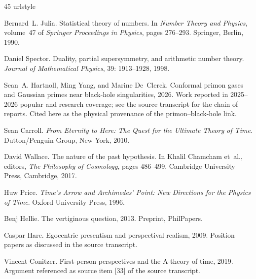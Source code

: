 \documentclass[11pt,a4paper]{article}
\theoremstyle{plain}
\theoremstyle{definition}
\theoremstyle{remark}
\begin{document}
\begin{thebibliography}{45}
\providecommand{\natexlab}[1]{#1}
\providecommand{\url}[1]{\texttt{#1}}
\expandafter\ifx\csname urlstyle\endcsname\relax
  \providecommand{\doi}[1]{doi: #1}\else
  \providecommand{\doi}{doi: \begingroup \urlstyle{rm}\Url}\fi

Bernard~L. Julia.
\newblock Statistical theory of numbers.
\newblock In \emph{Number Theory and Physics}, volume~47 of \emph{Springer
  Proceedings in Physics}, pages 276--293. Springer, Berlin, 1990.

Daniel Spector.
\newblock Duality, partial supersymmetry, and arithmetic number theory.
\newblock \emph{Journal of Mathematical Physics}, 39: 1913--1928,
  1998.

Sean~A. Hartnoll, Ming Yang, and Marine De~Clerck.
\newblock Conformal primon gases and {G}aussian primes near black-hole
  singularities, 2026.
\newblock Work reported in 2025--2026 popular and research coverage; see the
  source transcript for the chain of reports. Cited here as the physical
  provenance of the primon--black-hole link.

Sean Carroll.
\newblock \emph{From Eternity to Here: The Quest for the Ultimate Theory of
  Time}.
\newblock Dutton/Penguin Group, New York, 2010.

David Wallace.
\newblock The nature of the past hypothesis.
\newblock In Khalil Chamcham et~al., editors, \emph{The Philosophy of
  Cosmology}, pages 486--499. Cambridge University Press, Cambridge, 2017.

Huw Price.
\newblock \emph{Time's Arrow and {A}rchimedes' Point: New Directions for the
  Physics of Time}.
\newblock Oxford University Press, 1996.

Benj Hellie.
\newblock The vertiginous question, 2013.
\newblock Preprint, PhilPapers.

Caspar Hare.
\newblock Egocentric presentism and perspectival realism, 2009.
\newblock Position papers as discussed in the source transcript.

Vincent Conitzer.
\newblock First-person perspectives and the {A}-theory of time, 2019.
\newblock Argument referenced as source item [33] of the source transcript.


\end{thebibliography}
\end{document}
